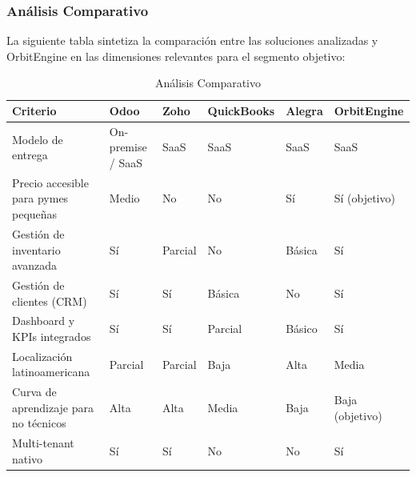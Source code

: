 \subsubsection{Análisis Comparativo}\label{anuxe1lisis-comparativo}

La siguiente tabla sintetiza la comparación entre las soluciones analizadas y OrbitEngine en las dimensiones relevantes para el segmento objetivo:

\begin{longtable}[]{@{}
  >{\raggedright\arraybackslash}p{}
  >{\raggedright\arraybackslash}p{}
  >{\raggedright\arraybackslash}p{}
  >{\raggedright\arraybackslash}p{}
  >{\raggedright\arraybackslash}p{}
  >{\raggedright\arraybackslash}p{}@{}}
\caption[Análisis Comparativo]{Análisis Comparativo}\tabularnewline
\toprule\noalign{}
\begin{minipage}[b]{\linewidth}\raggedright
Criterio
\end{minipage} & \begin{minipage}[b]{\linewidth}\raggedright
Odoo
\end{minipage} & \begin{minipage}[b]{\linewidth}\raggedright
Zoho
\end{minipage} & \begin{minipage}[b]{\linewidth}\raggedright
QuickBooks
\end{minipage} & \begin{minipage}[b]{\linewidth}\raggedright
Alegra
\end{minipage} & \begin{minipage}[b]{\linewidth}\raggedright
OrbitEngine
\end{minipage} \\
\midrule\noalign{}
\endhead
\bottomrule\noalign{}
\endlastfoot
Modelo de entrega & On-premise / SaaS & SaaS & SaaS & SaaS & SaaS \\
Precio accesible para pymes pequeñas & Medio & No & No & Sí & Sí (objetivo) \\
Gestión de inventario avanzada & Sí & Parcial & No & Básica & Sí \\
Gestión de clientes (CRM) & Sí & Sí & Básica & No & Sí \\
Dashboard y KPIs integrados & Sí & Sí & Parcial & Básico & Sí \\
Localización latinoamericana & Parcial & Parcial & Baja & Alta & Media \\
Curva de aprendizaje para no técnicos & Alta & Alta & Media & Baja & Baja (objetivo) \\
Multi-tenant nativo & Sí & Sí & No & No & Sí \\
\end{longtable}

